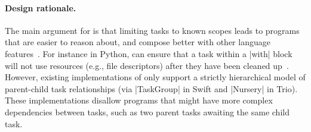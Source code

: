 \paragraph{Design rationale.}

The main argument for \dyn \extent is that limiting tasks to known scopes leads to programs that are easier to reason about, and compose better with other language features~\cite{mccall_swift_2021,elizarov_kotlin_2021}. For instance in Python, \dyn \extent can ensure that a task within a \code|with| block will not use resources (e.g., file descriptors) after they have been cleaned up~\cite{smith_thoughts_2016}. However, existing implementations of \dyn \extent only support a strictly hierarchical model of parent-child task relationships (via \code|TaskGroup| in Swift and \code|Nursery| in Trio). These implementations disallow programs that might have more complex dependencies between tasks, such as two parent tasks awaiting the same child task.
